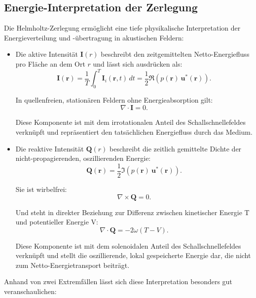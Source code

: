 \subsection{Energie-Interpretation der Zerlegung
\label{helmholtz:Energie_Interpretation}}
 
Die Helmholtz-Zerlegung ermöglicht eine tiefe physikalische Interpretation der Energieverteilung und -übertragung in akustischen Feldern:
 
\begin{itemize}
\item Die aktive Intensität $\boldsymbol{I}(r)$ beschreibt den zeitgemittelten Netto-Energiefluss pro Fläche an dem Ort $r$ und lässt sich ausdrücken als:
\begin{equation}
\boldsymbol{I}(\boldsymbol{r})
=
\frac{1}{T}\int_0^T \boldsymbol{I}_i(\boldsymbol{r},t)\,dt
=
\frac{1}{2}\Re\left( p(\boldsymbol{r})~\boldsymbol{u}^*(\boldsymbol{r})\right).
\end{equation}
 
In quellenfreien, stationären Feldern ohne Energieabsorption gilt:
\begin{equation}
\nabla \cdot \boldsymbol{I}
=
0.
\end{equation}
 
Diese Komponente ist mit dem irrotationalen Anteil des Schallschnellefeldes verknüpft und repräsentiert den tatsächlichen Energiefluss durch das Medium.
 
\item Die reaktive Intensität $\boldsymbol{Q}(r)$ beschreibt die zeitlich gemittelte Dichte der nicht-propagierenden, oszillierenden Energie:
\begin{equation}
\boldsymbol{Q}(\boldsymbol{r})
=
\frac{1}{2}\Im\left(p(\boldsymbol{r})~\boldsymbol{u}^*(\boldsymbol{r})\right).
\end{equation}
 
Sie ist wirbelfrei:
\begin{equation}
\nabla \times \boldsymbol{Q}
=
0.
\end{equation}
 
Und steht in direkter Beziehung zur Differenz zwischen kinetischer Energie T und potentieller Energie V:
\begin{equation}
\nabla \cdot \boldsymbol{Q}
=
-2 \omega (T-V).
\end{equation}
 
Diese Komponente ist mit dem solenoidalen Anteil des Schallschnellefeldes verknüpft und stellt die oszillierende, lokal gespeicherte Energie dar, die nicht zum Netto-Energietransport beiträgt.
\end{itemize}
Anhand von zwei Extremfällen lässt sich diese Interpretation besonders gut veranschaulichen:

